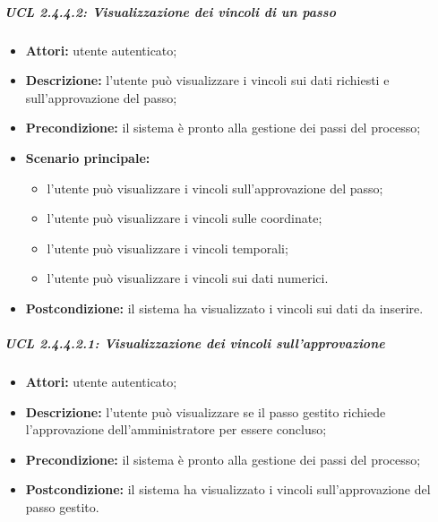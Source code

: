 \subparagraph{UCL 2.4.4.2: Visualizzazione dei vincoli di un passo}
\begin{itemize}
\item \textbf{Attori:} utente autenticato;
\item \textbf{Descrizione:} l'utente può visualizzare i vincoli sui dati richiesti e sull'approvazione del passo;
\item \textbf{Precondizione:} il sistema è pronto alla gestione dei passi del processo;
\item \textbf{Scenario principale:}
\begin{itemize}
\item l'utente può visualizzare i vincoli sull'approvazione del passo;
\item l'utente può visualizzare i vincoli sulle coordinate;
\item l'utente può visualizzare i vincoli temporali;
\item l'utente può visualizzare i vincoli sui dati numerici.
\end{itemize}
\item \textbf{Postcondizione:} il sistema ha visualizzato i vincoli sui dati da inserire.
\end{itemize}

\subparagraph{UCL 2.4.4.2.1: Visualizzazione dei vincoli sull'approvazione}
\begin{itemize}
\item \textbf{Attori:} utente autenticato;
\item \textbf{Descrizione:} l'utente può visualizzare se il passo gestito richiede l'approvazione dell'amministratore per essere concluso;
\item \textbf{Precondizione:} il sistema è pronto alla gestione dei passi del processo;
\item \textbf{Postcondizione:} il sistema ha visualizzato i vincoli sull'approvazione del passo gestito.
\end{itemize}

